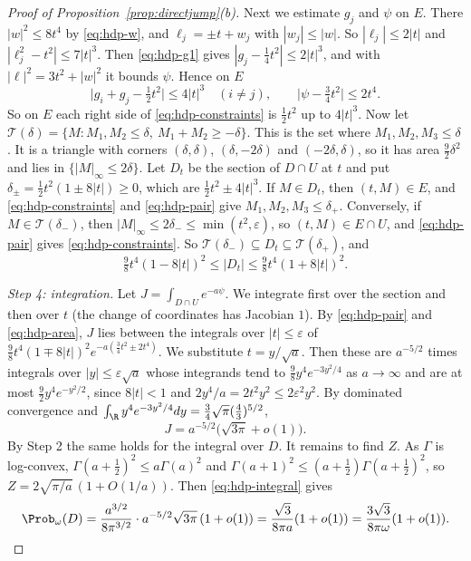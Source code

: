 \begin{proof}[Proof of Proposition~\ref{prop:directjump}(b)]
Next we estimate $g_j$ and $\psi$ on $E$. There $|w|^2\le8t^4$ by
\eqref{eq:hdp-w}, and $\ell_j=\pm t+w_j$ with $|w_j|\le|w|$. So
$|\ell_j|\le2|t|$ and $|\ell_j^2-t^2|\le7|t|^3$. Then \eqref{eq:hdp-g1} gives
$|g_j-\frac14t^2|\le2|t|^3$, and with $|\ell|^2=3t^2+|w|^2$ it bounds $\psi$.
Hence on $E$
\begin{equation}\label{eq:hdp-pair}
 \bigl|g_i+g_j-\tfrac12t^2\bigr|\le4|t|^3\quad(i\ne j),
 \qquad\bigl|\psi-\tfrac34t^2\bigr|\le2t^4.
\end{equation}
So on $E$ each right side of \eqref{eq:hdp-constraints} is $\frac12t^2$ up to
$4|t|^3$. Now let
$\mathcal T(\delta)=\{M:M_1,M_2\le\delta,\ M_1+M_2\ge-\delta\}$. This is the
set where $M_1,M_2,M_3\le\delta$. It is a triangle with corners
$(\delta,\delta)$, $(\delta,-2\delta)$ and $(-2\delta,\delta)$, so it has area
$\frac92\delta^2$ and lies in $\{|M|_\infty\le2\delta\}$. Let $D_t$ be the
section of $D\cap U$ at $t$ and put $\delta_\pm=\frac12t^2(1\pm8|t|)\ge0$,
which are $\frac12t^2\pm4|t|^3$. If $M\in D_t$, then $(t,M)\in E$, and
\eqref{eq:hdp-constraints} and \eqref{eq:hdp-pair} give
$M_1,M_2,M_3\le\delta_+$. Conversely, if $M\in\mathcal T(\delta_-)$, then
$|M|_\infty\le2\delta_-\le\min(t^2,\varepsilon)$, so $(t,M)\in E\cap U$, and
\eqref{eq:hdp-pair} gives \eqref{eq:hdp-constraints}. So
$\mathcal T(\delta_-)\subseteq D_t\subseteq\mathcal T(\delta_+)$, and
\begin{equation}\label{eq:hdp-area}
 \tfrac98t^4(1-8|t|)^2\le|D_t|\le\tfrac98t^4(1+8|t|)^2.
\end{equation}

\emph{Step 4: integration.} Let $J=\int_{D\cap U}e^{-a\psi}$. We integrate
first over the section and then over $t$ (the change of coordinates has
Jacobian $1$). By \eqref{eq:hdp-pair} and \eqref{eq:hdp-area}, $J$ lies
between the integrals over $|t|\le\varepsilon$ of
$\frac98t^4(1\mp8|t|)^2e^{-a(\frac34t^2\pm2t^4)}$. We substitute
$t=y/\sqrt a$. Then these are $a^{-5/2}$ times integrals over
$|y|\le\varepsilon\sqrt a$ whose integrands tend to $\frac98y^4e^{-3y^2/4}$ as
$a\to\infty$ and are at most $\frac92y^4e^{-y^2/2}$, since $8|t|<1$ and
$2y^4/a=2t^2y^2\le2\varepsilon^2y^2$. By dominated convergence and
$\int_{\R}y^4e^{-3y^2/4}dy=\frac34\sqrt\pi(\frac43)^{5/2}$,
\[
 J=a^{-5/2}\bigl(\sqrt{3\pi}+o(1)\bigr).
\]
By Step 2 the same holds for the integral over $D$. It remains to find $Z$. As
$\Gamma$ is log-convex, $\Gamma(a+\frac12)^2\le a\Gamma(a)^2$ and
$\Gamma(a+1)^2\le(a+\frac12)\Gamma(a+\frac12)^2$, so
$Z=2\sqrt{\pi/a}\,(1+O(1/a))$. Then \eqref{eq:hdp-integral} gives
\[
 \Prob_\omega(D)=\frac{a^{3/2}}{8\pi^{3/2}}\cdot a^{-5/2}\sqrt{3\pi}\,(1+o(1))
 =\frac{\sqrt3}{8\pi a}(1+o(1))=\frac{3\sqrt3}{8\pi\omega}(1+o(1)).
 \qedhere
\]
\end{proof}
